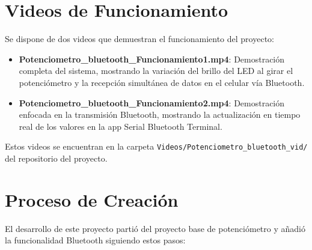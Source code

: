 \documentclass[12pt,a4paper]{article}
\begin{document}
\section{Videos de Funcionamiento}

Se dispone de dos videos que demuestran el funcionamiento del proyecto:

\begin{itemize}
    \item \textbf{Potenciometro\_bluetooth\_Funcionamiento1.mp4}: Demostración completa del sistema, mostrando la variación del brillo del LED al girar el potenciómetro y la recepción simultánea de datos en el celular vía Bluetooth.
    \item \textbf{Potenciometro\_bluetooth\_Funcionamiento2.mp4}: Demostración enfocada en la transmisión Bluetooth, mostrando la actualización en tiempo real de los valores en la app Serial Bluetooth Terminal.
\end{itemize}

Estos videos se encuentran en la carpeta \texttt{Videos/Potenciometro\_bluetooth\_vid/} del repositorio del proyecto.

\section{Proceso de Creación}

El desarrollo de este proyecto partió del proyecto base de potenciómetro y añadió la funcionalidad Bluetooth siguiendo estos pasos:
\end{document}

